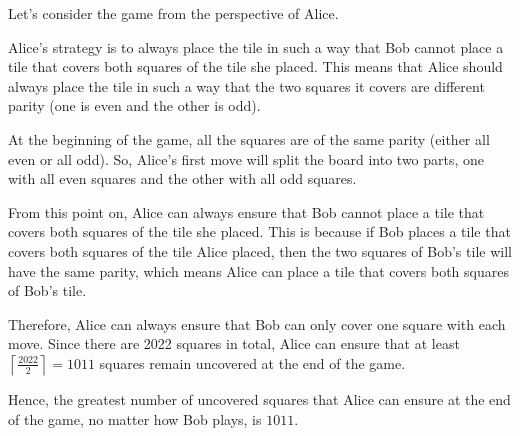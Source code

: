 Let's consider the game from the perspective of Alice. 

Alice's strategy is to always place the tile in such a way that Bob cannot place a tile that covers both squares of the tile she placed. This means that Alice should always place the tile in such a way that the two squares it covers are different parity (one is even and the other is odd). 

At the beginning of the game, all the squares are of the same parity (either all even or all odd). So, Alice's first move will split the board into two parts, one with all even squares and the other with all odd squares. 

From this point on, Alice can always ensure that Bob cannot place a tile that covers both squares of the tile she placed. This is because if Bob places a tile that covers both squares of the tile Alice placed, then the two squares of Bob's tile will have the same parity, which means Alice can place a tile that covers both squares of Bob's tile.

Therefore, Alice can always ensure that Bob can only cover one square with each move. Since there are 2022 squares in total, Alice can ensure that at least $\left\lceil \frac{2022}{2} \right\rceil = 1011$ squares remain uncovered at the end of the game.

Hence, the greatest number of uncovered squares that Alice can ensure at the end of the game, no matter how Bob plays, is $\boxed{1011}$.
